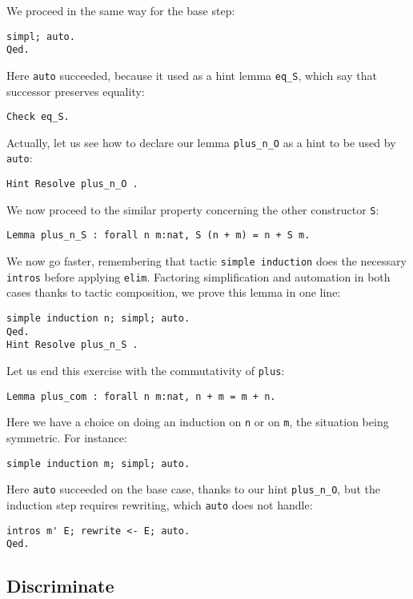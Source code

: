 \documentclass{book}
\begin{document}
We proceed in the same way for the base step:
\begin{lstlisting}
simpl; auto.
Qed.
\end{lstlisting}

Here \verb:auto: succeeded, because it used as a hint lemma \verb:eq_S:,
which say that successor preserves equality:
\begin{lstlisting}
Check eq_S.
\end{lstlisting}

Actually, let us see how to declare our lemma \verb:plus_n_O: as a hint
to be used by \verb:auto::
\begin{lstlisting}
Hint Resolve plus_n_O .
\end{lstlisting}

We now proceed to the similar property concerning the other constructor
\verb:S::
\begin{lstlisting}
Lemma plus_n_S : forall n m:nat, S (n + m) = n + S m.
\end{lstlisting}

We now go faster, remembering that tactic \verb:simple induction: does the
necessary \verb:intros: before applying \verb:elim:. Factoring simplification
and automation in both cases thanks to tactic composition, we prove this
lemma in one line:
\begin{lstlisting}
simple induction n; simpl; auto.
Qed.
Hint Resolve plus_n_S .
\end{lstlisting}

Let us end this exercise with the commutativity of \verb:plus::

\begin{lstlisting}
Lemma plus_com : forall n m:nat, n + m = m + n.
\end{lstlisting}

Here we have a choice on doing an induction on \verb:n: or on \verb:m:, the
situation being symmetric. For instance:
\begin{lstlisting}
simple induction m; simpl; auto.
\end{lstlisting}

Here \verb:auto: succeeded on the base case, thanks to our hint
\verb:plus_n_O:, but the induction step requires rewriting, which
\verb:auto: does not handle:

\begin{lstlisting}
intros m' E; rewrite <- E; auto.
Qed.
\end{lstlisting}

\subsection{Discriminate}
\end{document}
